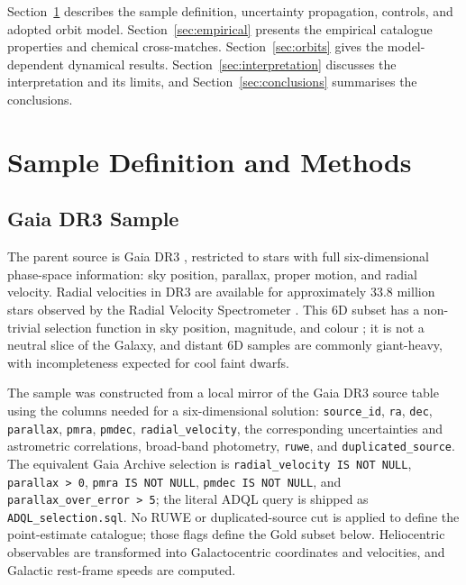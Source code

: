 \documentclass{aa}  %
\begin{document}
Section~\ref{sec:methods} describes the sample definition, uncertainty
propagation, controls, and adopted orbit model.
Section~\ref{sec:empirical} presents the empirical catalogue properties
and chemical cross-matches.  Section~\ref{sec:orbits} gives the
model-dependent dynamical results.
Section~\ref{sec:interpretation} discusses the interpretation and its
limits, and Section~\ref{sec:conclusions} summarises the conclusions.

\section{Sample Definition and Methods} \label{sec:methods}

\subsection{Gaia DR3 Sample} \label{sec:gaia_sample}

The parent source is Gaia DR3 \citep{Vallenari2023}, restricted to stars
with full six-dimensional phase-space information: sky position,
parallax, proper motion, and radial velocity.  Radial velocities in DR3
are available for approximately 33.8 million stars observed by the
Radial Velocity Spectrometer \citep{Katz2023}.  This 6D subset has a
non-trivial selection function in sky position, magnitude, and colour
\citep{CastroGinard2023, CantatGaudin2023}; it is not a neutral slice
of the Galaxy, and distant 6D samples are commonly giant-heavy, with
incompleteness expected for cool faint dwarfs.

The sample was constructed from a local mirror of the Gaia DR3 source
table using the columns needed for a six-dimensional solution:
\texttt{source\_id},
\texttt{ra}, \texttt{dec}, \texttt{parallax}, \texttt{pmra},
\texttt{pmdec}, \texttt{radial\_velocity}, the corresponding
uncertainties and astrometric correlations, broad-band photometry,
\texttt{ruwe}, and \texttt{duplicated\_source}.  The equivalent Gaia
Archive selection is
\texttt{radial\_velocity IS NOT NULL}, \texttt{parallax > 0},
\texttt{pmra IS NOT NULL}, \texttt{pmdec IS NOT NULL}, and
\texttt{parallax\_over\_error > 5}; the literal ADQL query is shipped as
\texttt{ADQL\_selection.sql}.  No RUWE or duplicated-source cut is
applied to define the point-estimate catalogue; those flags define the
Gold subset below.  Heliocentric observables are transformed into
Galactocentric coordinates and velocities, and Galactic rest-frame speeds
are computed.
\end{document}
